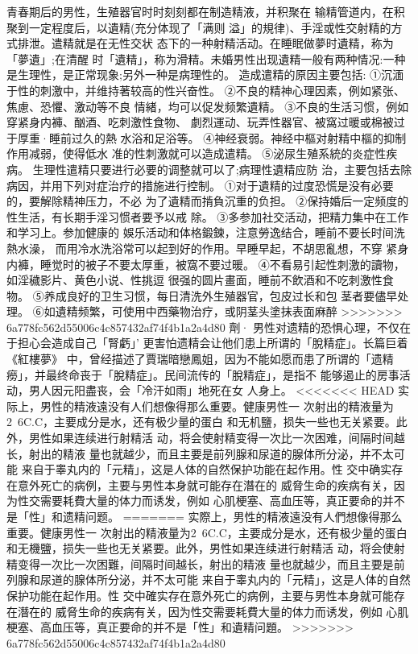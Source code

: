 \documentclass[12pt,UTF8]{ctexbook}
\begin{document}
青春期后的男性，生殖器官时时刻刻都在制造精液，并积聚在
输精管道内，在积聚到一定程度后，以遺精(充分体现了「满则
溢」的規律)、手淫或性交射精的方式排泄。遣精就是在无性交状
态下的一种射精活动。在睡眠做夢时遺精，称为「夢遺」;在清醒
时「遺精」，称为滑精。未婚男性出现遺精一般有两种情况:一种
是生理性，是正常现象;另外一种是病理性的。
造成遣精的原因主要包括:
①沉湎于性的刺激中，并维持著较高的性兴奋性。
②不良的精神心理因素，例如紧张、焦慮、恐懼、激动等不良
情緒，均可以促发频繁遺精。
③不良的生活习惯，例如穿紧身内褲、酗酒、吃刺激性食物、
劇烈運动、玩弄性器官、被窩过暖或棉被过于厚重·睡前过久的熱
水浴和足浴等。
④神经衰弱。神经中樞对射精中樞的抑制作用减弱，使得低水
准的性刺激就可以造成遣精。
⑤泌尿生殖系統的炎症性疾病。
生理性遣精只要进行必要的调整就可以了;病理性遺精应防
治，主要包括去除病因，并用下列对症治疗的措施进行控制。
①对于遺精的过度恐慌是没有必要的，要解除精神压力，不必
为了遺精而掯負沉重的负担。
②保持婚后一定频度的性生活，有长期手淫习惯者要予以戒
除。
③多参加社交活动，把精力集中在工作和学习上。参加健康的
娛乐活动和体格鍛鍊，注意勞逸结合，睡前不要长时间洗熱水澡，
而用冷水洗浴常可以起到好的作用。早睡早起，不胡思亂想，不穿
紧身内褲，睡觉时的被子不要太厚重，被窩不要过暖。
④不看易引起性刺激的讀物，如淫穢影片、黄色小说、性挑逗
很强的圆片畫面，睡前不飲酒和不吃刺激性食物。
⑤养成良好的卫生习惯，每日清洗外生殖器官，包皮过长和包
茎者要儘早处理。
⑥如遺精频繁，可使用中西藥物治疗，或阴茎头塗抹表面麻醉
>>>>>>> 6a778fc562d55006c4c857432af74f4b1a2a4d80
劑·
男性对遗精的恐惧心理，不仅在于担心会造成自己「腎虧」’
更害怕遗精会让他们患上所谓的「脫精症」。长篇巨着《紅樓夢》
中，曾经描述了賈瑞暗戀鳳姐，因为不能如愿而患了所谓的「遗精
癆」，并最终命丧于「脫精症」。民间流传的「脫精症」，是指不
能够遏止的房事活动，男人因元阳盡丧，会「冷汗如雨」地死在女
人身上。
<<<<<<< HEAD
实际上，男性的精液遠没有人们想像得那么重要。健康男性一
次射出的精液量为2~6C.C，主要成分是水，还有极少量的蛋白
和无机鹽，损失一些也无关紧要。此外，男性如果连续进行射精活
动，将会使射精变得一次比一次困难，间隔时间越长，射出的精液
量也就越少，而且主要是前列腺和尿道的腺体所分泌，并不太可能
来自于睾丸内的「元精」，这是人体的自然保护功能在起作用。性
交中确实存在意外死亡的病例，主要与男性本身就可能存在潛在的
威脅生命的疾病有关，因为性交需要耗費大量的体力而诱发，例如
心肌梗塞、高血压等，真正要命的并不是「性」和遗精问题。
=======
实際上，男性的精液遠没有人們想像得那么重要。健康男性一
次射出的精液量为2~6C.C，主要成分是水，还有极少量的蛋白
和无機鹽，损失一些也无关紧要。此外，男性如果连续进行射精活
动，将会使射精变得一次比一次困難，间隔时间越长，射出的精液
量也就越少，而且主要是前列腺和尿道的腺体所分泌，并不太可能
来自于睾丸内的「元精」，这是人体的自然保护功能在起作用。性
交中確实存在意外死亡的病例，主要与男性本身就可能存在潛在的
威脅生命的疾病有关，因为性交需要耗費大量的体力而诱发，例如
心肌梗塞、高血压等，真正要命的并不是「性」和遺精问題。
>>>>>>> 6a778fc562d55006c4c857432af74f4b1a2a4d80
\end{document}
